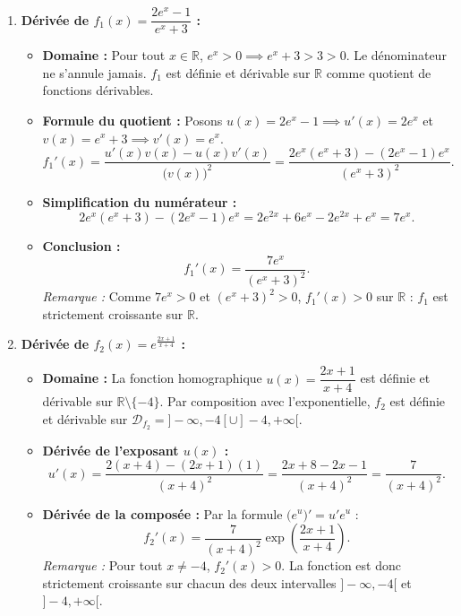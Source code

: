\documentclass[11pt,a4paper]{article}
\newcommand{\R}{\mathbb{R}}
\begin{document}
\begin{correctionbox}[Exercice 4]
\begin{enumerate}[label=\textbf{\arabic*.}]
    \item \textbf{Dérivée de $f_1(x) = \dfrac{2e^x - 1}{e^x + 3}$ :}
    \begin{itemize}
        \item \textbf{Domaine :} Pour tout $x \in \R$, $e^x > 0 \implies e^x + 3 > 3 > 0$. Le dénominateur ne s'annule jamais. $f_1$ est définie et dérivable sur $\R$ comme quotient de fonctions dérivables.
        \item \textbf{Formule du quotient :} Posons $u(x) = 2e^x - 1 \implies u'(x) = 2e^x$ et $v(x) = e^x + 3 \implies v'(x) = e^x$.
        \[
        f_1'(x) = \frac{u'(x)v(x) - u(x)v'(x)}{\bigl(v(x)\bigr)^2} = \frac{2e^x(e^x + 3) - (2e^x - 1)e^x}{(e^x + 3)^2}.
        \]
        \item \textbf{Simplification du numérateur :}
        \[
        2e^x(e^x + 3) - (2e^x - 1)e^x = 2e^{2x} + 6e^x - 2e^{2x} + e^x = 7e^x.
        \]
        \item \textbf{Conclusion :}
        \[
        \boxed{f_1'(x) = \frac{7e^x}{(e^x + 3)^2}}.
        \]
        \textit{Remarque :} Comme $7e^x > 0$ et $(e^x+3)^2 > 0$, $f_1'(x) > 0$ sur $\R$ : $f_1$ est strictement croissante sur $\R$.
    \end{itemize}

    \item \textbf{Dérivée de $f_2(x) = e^{\frac{2x+1}{x+4}}$ :}
    \begin{itemize}
        \item \textbf{Domaine :} La fonction homographique $u(x) = \dfrac{2x+1}{x+4}$ est définie et dérivable sur $\R \setminus \{-4\}$. Par composition avec l'exponentielle, $f_2$ est définie et dérivable sur $\mathcal{D}_{f_2} = ]-\infty, -4[ \cup ]-4, +\infty[$.
        \item \textbf{Dérivée de l'exposant $u(x)$ :}
        \[
        u'(x) = \frac{2(x+4) - (2x+1)(1)}{(x+4)^2} = \frac{2x + 8 - 2x - 1}{(x+4)^2} = \frac{7}{(x+4)^2}.
        \]
        \item \textbf{Dérivée de la composée :} Par la formule $\bigl(e^u\bigr)' = u' e^u$ :
        \[
        \boxed{f_2'(x) = \frac{7}{(x+4)^2} \exp\left(\frac{2x+1}{x+4}\right)}.
        \]
        \textit{Remarque :} Pour tout $x \neq -4$, $f_2'(x) > 0$. La fonction est donc strictement croissante sur chacun des deux intervalles $]-\infty, -4[$ et $]-4, +\infty[$.
    \end{itemize}


\end{enumerate}
\end{correctionbox}
\end{document}
